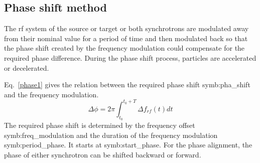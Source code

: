 %
%
%
%

\subsection{Phase shift method}

The rf system of the source or target or both synchrotrons are modulated away from their nominal value for a period of time and then modulated back so that the phase shift created by the frequency modulation could compensate for the required phase difference. During the phase shift process, particles are accelerated or decelerated.

Eq.~\ref{phase1} gives the relation between the required phase shift \gls{symb:pha_shift} and the frequency modulation. 
\begin{equation}
\Delta \phi= 2\pi \int_{t_0}^{t_0+T} \Delta f_{rf}(t)dt \label{phase1}
\end{equation}
The required phase shift is determined by the frequency offset \gls{symb:freq_modulation} and the duration of the frequency modulation \gls{symb:period_phase}. It starts at \gls{symb:start_phase}. For the phase alignment, the phase of either synchrotron can be shifted backward or forward. %

